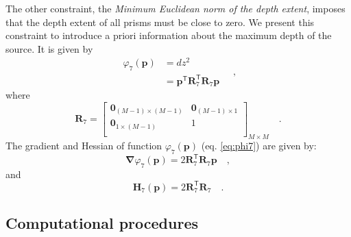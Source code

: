 The other constraint, the \textit{Minimum Euclidean norm of the depth extent}, imposes that the depth extent of all prisms must be close to zero. We present this constraint to introduce a priori information about the maximum depth of the source. It is given by
\begin{equation}\label{eq:phi7}
\begin{split}
\varphi_{7}(\mathbf{p}) &= dz^2 \\
&= \mathbf{p}^{\mathsf{T}} \mathbf{R}_{7}^{\mathsf{T}} \mathbf{R}_{7} \mathbf{p}
\end{split} \quad ,
\end{equation}
where
\begin{equation}
\mathbf{R}_{7} =
\begin{bmatrix}
\mathbf{0}_{(M-1) \times (M-1)} & \mathbf{0}_{(M-1) \times 1} \\
\mathbf{0}_{1 \times (M-1)} & 1 \\
\end{bmatrix}_{ M \times M } \quad .
\end{equation}
The gradient and Hessian of function $\varphi_{7}(\mathbf{p})$ (eq. \ref{eq:phi7}) are given by:
\begin{equation}\label{eq:phi7_grad}
\boldsymbol{\nabla}\varphi_{7}(\mathbf{p}) = 2 \mathbf{R}_{7}^{\mathsf{T}} \mathbf{R}_{7} \mathbf{p} \quad ,
\end{equation}
and
\begin{equation}\label{eq:phi7_hessian}
\mathbf{H}_{7}(\mathbf{p}) = 2 \mathbf{R}^{\mathsf{T}}_{7}\mathbf{R}_{7} \quad .
\end{equation}

\subsection{Computational procedures}

